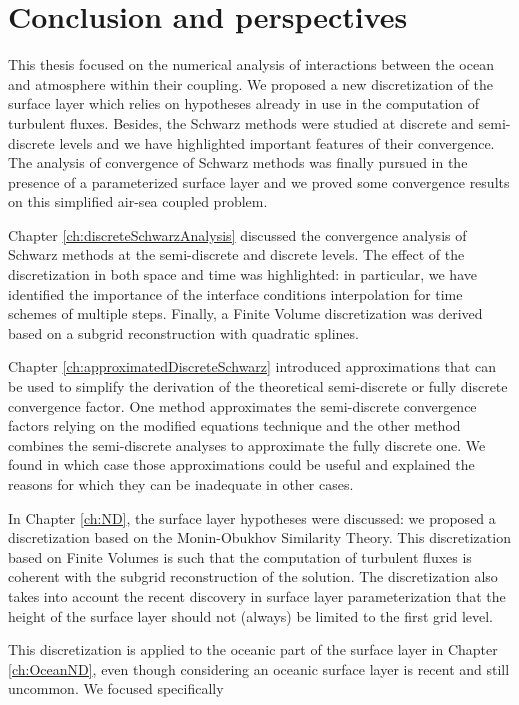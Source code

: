\chapter*{Conclusion and perspectives}
\label{ch:conclusion}
This thesis focused on the numerical analysis of interactions between
the ocean and atmosphere within their coupling. We proposed a
new discretization of the surface layer which relies on
hypotheses already in use in the computation of turbulent fluxes.
Besides, the Schwarz methods were studied at discrete and
semi-discrete levels and we have highlighted important features
of their convergence. The analysis of convergence of Schwarz methods
was finally pursued
in the presence of a parameterized surface layer and we
proved some convergence results on this simplified air-sea coupled
problem.
\par
Chapter \ref{ch:discreteSchwarzAnalysis} discussed the convergence
analysis of Schwarz methods at the semi-discrete and discrete
levels. The effect of the discretization in both
space and time was highlighted: in particular, we have identified
the importance of the interface conditions interpolation
for time schemes of multiple steps.
Finally, a Finite Volume discretization was derived based
on a subgrid reconstruction with quadratic splines.
\par
Chapter \ref{ch:approximatedDiscreteSchwarz} introduced
approximations that can be used to simplify the derivation
of the theoretical semi-discrete or fully discrete convergence factor.
One method approximates the semi-discrete convergence factors
relying on the modified equations technique and
the other method combines the semi-discrete analyses
to approximate the fully discrete one.
We found in which case those approximations could be useful and
explained the reasons for which they can be inadequate in other
cases.
\par
In Chapter \ref{ch:ND}, the surface layer hypotheses were discussed:
we proposed a discretization based on the Monin-Obukhov Similarity
Theory. This discretization based on Finite Volumes
is such that the computation of turbulent fluxes is coherent
with the subgrid reconstruction of the solution.
The discretization also takes into account the recent discovery
in surface layer parameterization that the height of the
surface layer should not (always) be limited to the first grid level.
\par
This discretization is applied to the oceanic part of the surface
layer in Chapter \ref{ch:OceanND}, even though considering an oceanic
surface layer is recent and still uncommon. We focused specifically
